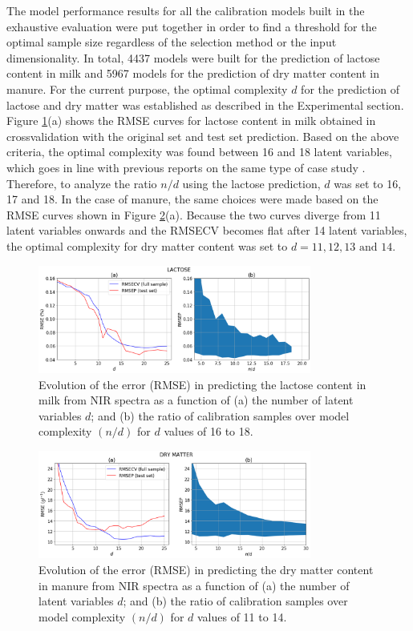 \documentclass[journal=ancham,manuscript=article]{achemso}
\begin{document}
The model performance results for all the calibration models built in the exhaustive evaluation were put together in order to find a threshold for the optimal sample size regardless of the selection method or the input dimensionality. In total, 4437 models were built for the prediction of lactose content in milk and 5967 models for the prediction of dry matter content in manure. For the current purpose, the optimal complexity $d$ for the prediction of lactose and dry matter was established as described in the Experimental section. Figure \ref{fig_d01_milk_general_framework}(a) shows the RMSE curves for lactose content in milk obtained in crossvalidation with the original set and test set prediction. Based on the above criteria, the optimal complexity was found between 16 and 18 latent variables, which goes in line with previous reports on the same type of case study \cite{Diaz-Olivares2020}. Therefore, to analyze the ratio $n/d$ using the lactose prediction, $d$ was set to 16, 17 and 18. In the case of manure, the same choices were made based on the RMSE curves shown in Figure \ref{fig_d02_manure_general_framework}(a). Because the two curves diverge from 11 latent variables onwards and the RMSECV becomes flat after 14 latent variables, the optimal complexity for dry matter content was set to $d = 11,12,13 \text{ and } 14$\cite{Saeys2005}. 


\begin{figure}[H]
\includegraphics[width=0.8\textwidth]{manuscript/figures/d01_milk_general_framework.png}
\centering
\caption{Evolution of the error (RMSE) in predicting the lactose content in milk from NIR spectra as a function of (a) the number of latent variables $d$; and (b) the ratio of calibration samples over model complexity $(n/d)$ for $d$ values of 16 to 18.}
\label{fig_d01_milk_general_framework}
\end{figure}

\begin{figure}[H]
\includegraphics[width=0.8\textwidth]{manuscript/figures/d02_manure_general_framework.png}
\centering
\caption{Evolution of the error (RMSE) in predicting the dry matter content in manure from NIR spectra as a function of (a) the number of latent variables $d$; and (b) the ratio of calibration samples over model complexity $(n/d)$ for $d$ values of 11 to 14.}
\label{fig_d02_manure_general_framework}
\end{figure}
\end{document}
